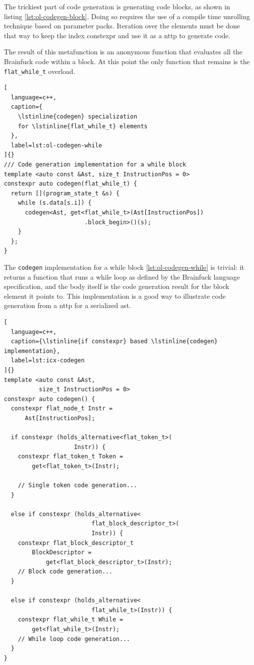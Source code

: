\documentclass[../main]{subfiles}
\begin{document}
The trickiest part of code generation is generating code blocks, as shown in
listing \ref{lst:ol-codegen-block}. Doing so requires the use of a compile time
unrolling technique based on \cpp parameter packs.
Iteration over the elements must be done that way to keep the index
\gls{constexpr} and use it as a \gls{nttp} to generate code.

The result of this metafunction is an anonymous function that evaluates all the
Brainfuck code within a block. At this point the only function that remains
is the \lstinline{flat_while_t} overload.

\begin{lstlisting}[
  language=c++,
  caption={
    \lstinline{codegen} specialization
    for \lstinline{flat_while_t} elements
  },
  label=lst:ol-codegen-while
]{}
/// Code generation implementation for a while block
template <auto const &Ast, size_t InstructionPos = 0>
constexpr auto codegen(flat_while_t) {
  return [](program_state_t &s) {
    while (s.data[s.i]) {
      codegen<Ast, get<flat_while_t>(Ast[InstructionPos])
                       .block_begin>()(s);
    }
  };
}
\end{lstlisting}

The \lstinline{codegen} implementation for a while block
\ref{lst:ol-codegen-while} is trivial: it returns a function that runs a while
loop as defined by the Brainfuck language specification, and the body itself is
the code generation result for the block element it points to.
This implementation is a good way to illustrate code generation from a
\gls{nttp} for a serialized \gls{ast}.

\begin{lstlisting}[
  language=c++,
  caption={\lstinline{if constexpr} based \lstinline{codegen} implementation},
  label=lst:icx-codegen
]{}
template <auto const &Ast,
          size_t InstructionPos = 0>
constexpr auto codegen() {
  constexpr flat_node_t Instr =
      Ast[InstructionPos];

  if constexpr (holds_alternative<flat_token_t>(
                    Instr)) {
    constexpr flat_token_t Token =
        get<flat_token_t>(Instr);

    // Single token code generation...
  }

  else if constexpr (holds_alternative<
                         flat_block_descriptor_t>(
                         Instr)) {
    constexpr flat_block_descriptor_t
        BlockDescriptor =
            get<flat_block_descriptor_t>(Instr);
    // Block code generation...
  }

  else if constexpr (holds_alternative<
                         flat_while_t>(Instr)) {
    constexpr flat_while_t While =
        get<flat_while_t>(Instr);
    // While loop code generation...
  }
}
\end{lstlisting}
\end{document}
